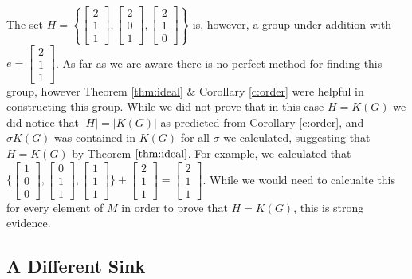 \documentclass[12pt]{article}
\begin{document}
The set $H= \left\{\begin{bmatrix}2 \\ 1 \\ 1 \end{bmatrix}, \begin{bmatrix}2 \\ 0 \\ 1 \end{bmatrix}, \begin{bmatrix} 2 \\ 1 \\ 0 \end{bmatrix} \right\}$ is, however, a group under addition with $e=\begin{bmatrix}2 \\ 1 \\ 1 \end{bmatrix}$.  As far as we are aware there is no perfect method for finding this group, however Theorem \ref{thm:ideal} \& Corollary \ref{c:order} were helpful in constructing this group.  While we did not prove that in this case $H=K(G)$ we did notice that $|H|=|K(G)|$ as predicted from Corollary \ref{c:order}, and $\sigma K(G)$ was contained in $K(G)$ for all $\sigma$ we calculated, suggesting that $H=K(G)$ by Theorem $\ref{thm:ideal}$.  For example, we calculated that $\Bigg\{\begin{bmatrix}1 \\ 0 \\ 0\end{bmatrix}, \begin{bmatrix}0 \\ 1 \\ 1\end{bmatrix}, \begin{bmatrix}1 \\ 1 \\ 1\end{bmatrix} \Bigg\} + \begin{bmatrix}2\\1\\1\end{bmatrix} = \begin{bmatrix}2 \\ 1 \\ 1\end{bmatrix}$.  While we would need to calcualte this for every element of $M$ in order to prove that $H=K(G)$, this is strong evidence.

\subsection{A Different Sink}
\end{document}
